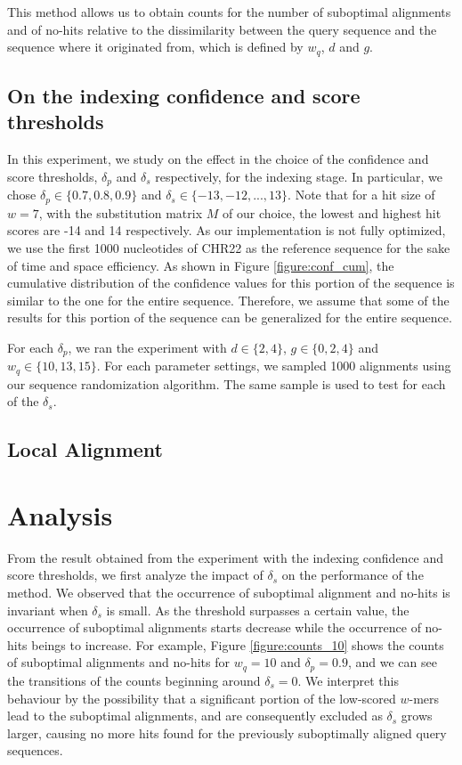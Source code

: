 \documentclass{article}
\begin{document}
This method allows us to obtain counts for the number of suboptimal alignments and of no-hits relative to the dissimilarity between the query sequence and the sequence where it originated from, which is defined by $w_q$, $d$ and $g$. 

\subsection{On the indexing confidence and score thresholds}

In this experiment, we study on the effect in the choice of the confidence and score thresholds, $\delta_p$ and $\delta_s$ respectively, for the indexing stage. In particular, we chose $\delta_p \in \{0.7, 0.8, 0.9\} $ and $\delta_s \in \{-13, -12, ... , 13\}$. Note that for a hit size of $w = 7$, with the substitution matrix $M$ of our choice, the lowest and highest hit scores are -14 and 14 respectively. As our implementation is not fully optimized, we use the first 1000 nucleotides of CHR22 as the reference sequence for the sake of time and space efficiency. As shown in Figure \ref{figure:conf_cum}, the cumulative distribution of the confidence values for this portion of the sequence is similar to the one for the entire sequence. Therefore, we assume that some of the results for this portion of the sequence can be generalized for the entire sequence.

For each $\delta_p$, we ran the experiment with $d \in \{2, 4\}$, $g \in \{0, 2, 4\}$ and $w_q \in \{10, 13, 15\}$. For each parameter settings, we sampled 1000 alignments using our sequence randomization algorithm. The same sample is used to test for each of the $\delta_s$.

\subsection{Local Alignment}

\section{Analysis}

From the result obtained from the experiment with the indexing confidence and score thresholds, we first analyze the impact of $\delta_s$ on the performance of the method. We observed that the occurrence of suboptimal alignment and no-hits is invariant when $\delta_s$ is small. As the threshold surpasses a certain value, the occurrence of suboptimal alignments starts decrease while the occurrence of no-hits beings to increase. For example, Figure \ref{figure:counts_10} shows the counts of suboptimal alignments and no-hits for $w_q = 10$ and $\delta_p = 0.9$, and we can see the transitions of the counts beginning around $\delta_s = 0$. We interpret this behaviour by the possibility that a significant portion of the low-scored $w$-mers lead to the suboptimal alignments, and are consequently excluded as $\delta_s$ grows larger, causing no more hits found for the previously suboptimally aligned query sequences. 
\end{document}

